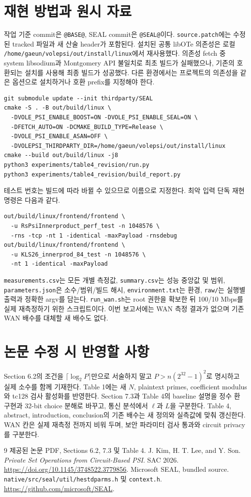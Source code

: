 \documentclass[11pt,a4paper]{article}
\begin{document}
\section{재현 방법과 원시 자료}
작업 기준 commit은 \texttt{@BASE@},
SEAL commit은 \texttt{@SEAL@}이다.
\texttt{source.patch}에는 수정된 tracked 파일과 새 산술 header가 포함된다.
설치된 공통 libOTe 의존성은 로컬 \texttt{/home/gaeun/volepsi/out/install/linux}에서 재사용했다.
의존성 fetch 중 system libsodium과 Montgomery API 불일치로 최초 빌드가 실패했으나,
기존의 호환되는 설치를 사용해 최종 빌드가 성공했다.
다른 환경에서는 프로젝트의 의존성을 같은 옵션으로 설치하거나 호환 prefix를 지정해야 한다.
\begin{lstlisting}
git submodule update --init thirdparty/SEAL
cmake -S . -B out/build/linux \
  -DVOLE_PSI_ENABLE_BOOST=ON -DVOLE_PSI_ENABLE_SEAL=ON \
  -DFETCH_AUTO=ON -DCMAKE_BUILD_TYPE=Release \
  -DVOLE_PSI_ENABLE_ASAN=OFF \
  -DVOLEPSI_THIRDPARTY_DIR=/home/gaeun/volepsi/out/install/linux
cmake --build out/build/linux -j8
python3 experiments/table4_revision/run.py
python3 experiments/table4_revision/build_report.py
\end{lstlisting}
테스트 번호는 빌드에 따라 바뀔 수 있으므로 이름으로 지정한다.
최악 입력 단독 재현 명령은 다음과 같다.
\begin{lstlisting}
out/build/linux/frontend/frontend \
  -u RsPsiInnerproduct_perf_test -n 1048576 \
  -rns -tcp -nt 1 -identical -maxPayload -rnsdebug
out/build/linux/frontend/frontend \
  -u KLS26_innerprod_84_test -n 1048576 \
  -nt 1 -identical -maxPayload
\end{lstlisting}

\texttt{measurements.csv}는 모든 개별 측정값,
\texttt{summary.csv}는 성능 중앙값 및 범위,
\texttt{parameters.json}은 소수/범위/빌드 해시,
\texttt{environment.txt}는 환경,
\texttt{raw/}는 실행별 출력과 정확한 argv를 담는다.
\texttt{run\_wan.sh}는 root 권한을 확보한 뒤 100/10 Mbps를 실제 재측정하기 위한 스크립트이다.
이번 보고서에는 WAN 측정 결과가 없으며 기존 WAN 배수를 대체할 새 배수도 없다.

\section{논문 수정 시 반영할 사항}
Section 6.2의 조건을 $\lceil\log_2 P\rceil$만으로 서술하지 말고
$P>n(2^{32}-1)^2$로 명시하고 실제 소수를 함께 기재한다.
Table 1에는 새 $N$, plaintext primes, coefficient modulus와 tc128 검사 활성화를 반영한다.
Section 7.3과 Table 4의 baseline 설명을 정수 환 구현과 32-bit choice 분해로 바꾸고,
통신 분석에서 $\ell$과 $L$을 구분한다.
Table 4, abstract, introduction, conclusion의 기존 배수는 새 정의와 실측값에 맞춰 갱신한다.
WAN 칸은 실제 재측정 전까지 비워 두며, 보안 파라미터 검사 통과와 circuit privacy를 구분한다.

\begin{thebibliography}{9}
\bibitem{paper} 제공된 논문 PDF, Sections 6.2, 7.3 및 Table 4.
\bibitem{kls} J. Kim, H. T. Lee, and Y. Son.
\textit{Private Set Operations from Circuit-Based PSI}. SAC 2026.
\url{https://doi.org/10.1145/3748522.3779856}.
\bibitem{seal} Microsoft SEAL, bundled source.
\texttt{native/src/seal/util/hestdparms.h} 및 \texttt{context.h}.
\url{https://github.com/microsoft/SEAL}.
\end{thebibliography}
\end{document}
